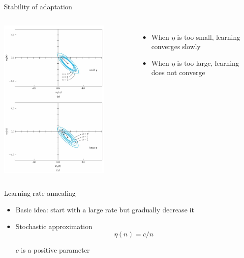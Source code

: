 \documentclass[notes]{beamer}
\newcommand{\begincols}[1]{\begin{columns}{#1}}
\newcommand{\stopcols}{\end{columns}}
\providecommand{\tightlist}{%
  \setlength{\itemsep}{0pt}\setlength{\parskip}{0pt}}
\begin{document}
\begin{frame}{Stability of adaptation}

\begincols{}


\includegraphics[width=0.80000\textwidth]{2018-03-10-10-13-18.png}\\


\begin{itemize}
\tightlist
\item
  When \(\eta\) is too small, learning converges slowly
\item
  When \(\eta\) is too large, learning does not converge
\end{itemize}

\stopcols

\end{frame}

\begin{frame}{Learning rate annealing}

\begin{itemize}
\item
  Basic idea: start with a large rate but gradually decrease it
\item
  Stochastic approximation \[\eta(n) = c/n\]

  \(c\) is a positive parameter
\end{itemize}

\end{frame}
\end{document}
